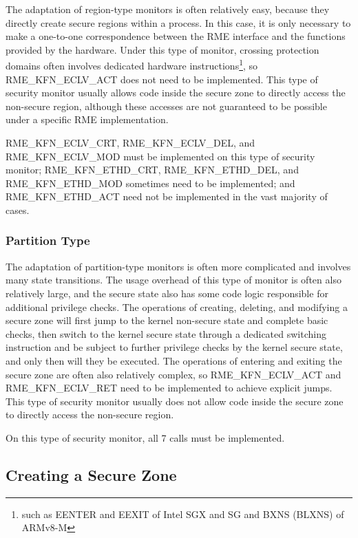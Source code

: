 The adaptation of region-type monitors is often relatively easy, because they directly create secure regions within a process. In this case, it is only necessary to make a one-to-one correspondence between the RME interface and the functions provided by the hardware. Under this type of monitor, crossing protection domains often involves dedicated hardware instructions\footnote{such as EENTER and EEXIT of Intel SGX and SG and BXNS (BLXNS) of ARMv8-M}, so RME\_KFN\_ECLV\_ACT does not need to be implemented. This type of security monitor usually allows code inside the secure zone to directly access the non-secure region, although these accesses are not guaranteed to be possible under a specific RME implementation.

RME\_KFN\_ECLV\_CRT, RME\_KFN\_ECLV\_DEL, and RME\_KFN\_ECLV\_MOD must be implemented on this type of security monitor; RME\_KFN\_ETHD\_CRT, RME\_KFN\_ETHD\_DEL, and RME\_KFN\_ETHD\_MOD sometimes need to be implemented; and RME\_KFN\_ETHD\_ACT need not be implemented in the vast majority of cases.

\subsubsection{Partition Type}\label{subsubsec:8-partition-type}

The adaptation of partition-type monitors is often more complicated and involves many state transitions. The usage overhead of this type of monitor is often also relatively large, and the secure state also has some code logic responsible for additional privilege checks. The operations of creating, deleting, and modifying a secure zone will first jump to the kernel non-secure state and complete basic checks, then switch to the kernel secure state through a dedicated switching instruction and be subject to further privilege checks by the kernel secure state, and only then will they be executed. The operations of entering and exiting the secure zone are often also relatively complex, so RME\_KFN\_ECLV\_ACT and RME\_KFN\_ECLV\_RET need to be implemented to achieve explicit jumps. This type of security monitor usually does not allow code inside the secure zone to directly access the non-secure region.

On this type of security monitor, all 7 calls must be implemented.

\subsection{Creating a Secure Zone}\label{subsec:8-create-enclave}

